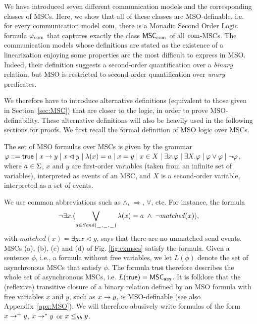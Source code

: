 
We have introduced seven different communication models and the corresponding classes of MSCs. Here, we show that all of these classes are MSO-definable, i.e. for every
communication model $\textup{com}$,
there is a Monadic Second Order Logic formula 
$\varphi_{{\textup{com}}}$ that captures 
exactly the class
$\mathsf{MSC}_{\textup{com}}$ of all
$\textup{com}$-MSCs.
The communication models whose definitions
are stated as the existence of a linearization enjoying some properties are the most difficult
to express in MSO. 
Indeed, their definition suggests
a second-order quantification over a \emph{binary} relation, but MSO is restricted to second-order quantification over 
\emph{unary} predicates. 

We therefore have to introduce alternative definitions (equivalent to those given in Section~\ref{sec:MSC}) that are closer to the logic, in order to prove MSO-definability. These alternative definitions will also be heavily used in the following sections for proofs. We first recall the formal definition of MSO logic over MSCs.

\begin{definition}
The set of MSO formulas over MSCs is given by the grammar
$
\varphi ::= \mathsf{true} \mid x \to y \mid x \lhd y \mid \lambda(x) = a \mid x = y \mid x \in X \mid \exists x.\varphi \mid \exists X.\varphi \mid \varphi \vee \varphi \mid \neg \varphi
$,
where $a \in \Sigma$, $x$ and $y$ are first-order variables (taken from an infinite set of variables), interpreted as
events of an MSC, and $X$ is a second-order variable, interpreted
as a set of events.
\end{definition}

We use common abbreviations such as $\wedge$, $\Rightarrow$, $\forall$, etc. 
For instance, the formula $$\neg\exists x.(\bigvee_{a \in {\mathit{Send}(\hspace{0.1em}\underline{\hspace{0.5em}}\hspace{0.1em},\hspace{0.1em}\underline{\hspace{0.5em}}\hspace{0.1em},\hspace{0.1em}\underline{\hspace{0.5em}}\hspace{0.1em})}} \lambda(x) = a \;\wedge\; \neg \mathit{matched}(x)),$$
with $\mathit{matched}(x) = \exists y.x \lhd y$,
says that there are no unmatched send events. MSCs (a), (b), (c) and (d) of Fig. \ref{fig:exmscs} satisfy the formula. Given a sentence $\phi$, i.e., a formula without free variables,
we let $L(\phi)$ denote the set of asynchronous MSCs that satisfy $\phi$. The formula $\mathsf{true}$ therefore describes the whole set of asynchronous MSCs, i.e. $L(\mathsf{true}) = \mathsf{MSC}_{\mathtt{asy}}$. It is folklore that the (reflexive) transitive closure of a binary relation defined by an MSO formula with free variables $x$ and $y$, such as $x \to y$, is MSO-definable (see also Appendix~\ref{apx:MSO}). We will therefore abusively write formulas of the form $x \to^+ y$, $x \to^* y$ or $x \leq_{hb} y$.

